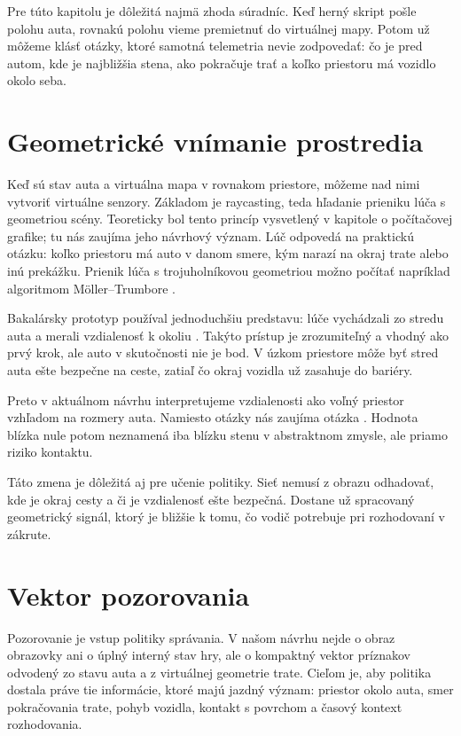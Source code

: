 Pre túto kapitolu je dôležitá najmä zhoda súradníc. Keď herný skript pošle polohu auta, rovnakú polohu vieme premietnuť do virtuálnej mapy. Potom už môžeme klásť otázky, ktoré samotná telemetria nevie zodpovedať: čo je pred autom, kde je najbližšia stena, ako pokračuje trať a koľko priestoru má vozidlo okolo seba.

\section{Geometrické vnímanie prostredia}

Keď sú stav auta a virtuálna mapa v rovnakom priestore, môžeme nad nimi vytvoriť virtuálne senzory. Základom je raycasting, teda hľadanie prieniku lúča s geometriou scény. Teoreticky bol tento princíp vysvetlený v kapitole o počítačovej grafike; tu nás zaujíma jeho návrhový význam. Lúč odpovedá na praktickú otázku: koľko priestoru má auto v danom smere, kým narazí na okraj trate alebo inú prekážku. Prienik lúča s trojuholníkovou geometriou možno počítať napríklad algoritmom Möller--Trumbore \cite{moller1997raytriangle}.

Bakalársky prototyp používal jednoduchšiu predstavu: lúče vychádzali zo stredu auta a merali vzdialenosť k okoliu \cite{melkovic2024bachelor}. Takýto prístup je zrozumiteľný a vhodný ako prvý krok, ale auto v skutočnosti nie je bod. V úzkom priestore môže byť stred auta ešte bezpečne na ceste, zatiaľ čo okraj vozidla už zasahuje do bariéry.

Preto v aktuálnom návrhu interpretujeme vzdialenosti ako voľný priestor vzhľadom na rozmery auta. Namiesto otázky  nás zaujíma otázka . Hodnota blízka nule potom neznamená iba blízku stenu v abstraktnom zmysle, ale priamo riziko kontaktu.

Táto zmena je dôležitá aj pre učenie politiky. Sieť nemusí z obrazu odhadovať, kde je okraj cesty a či je vzdialenosť ešte bezpečná. Dostane už spracovaný geometrický signál, ktorý je bližšie k tomu, čo vodič potrebuje pri rozhodovaní v zákrute.

\section{Vektor pozorovania}

Pozorovanie je vstup politiky správania. V našom návrhu nejde o obraz obrazovky ani o úplný interný stav hry, ale o kompaktný vektor príznakov odvodený zo stavu auta a z virtuálnej geometrie trate. Cieľom je, aby politika dostala práve tie informácie, ktoré majú jazdný význam: priestor okolo auta, smer pokračovania trate, pohyb vozidla, kontakt s povrchom a časový kontext rozhodovania.

